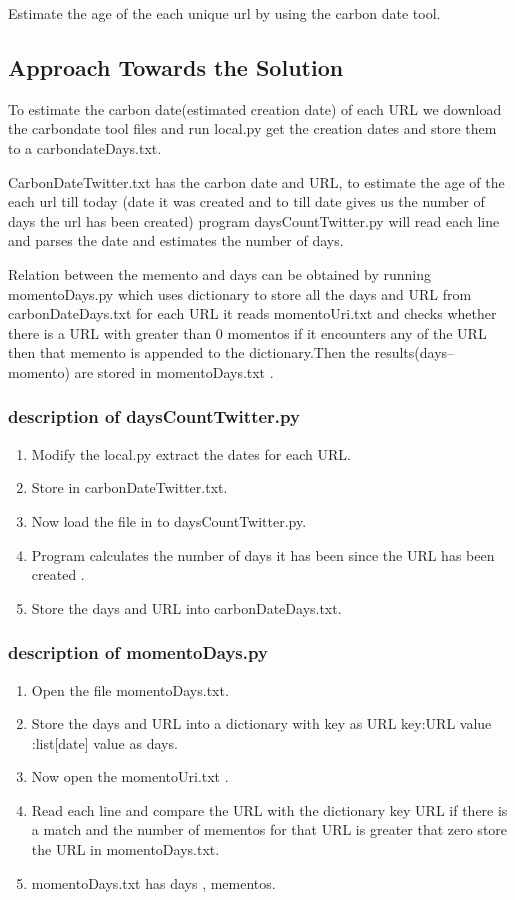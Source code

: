 \documentclass[12pt]{article}
\begin{document}
Estimate the age of the each unique url by using the carbon date tool.
\subsection{Approach Towards the Solution}

To estimate the carbon date(estimated creation date) of each URL we download the carbondate tool files and run local.py get the creation dates and store them to a carbondateDays.txt.

CarbonDateTwitter.txt has the carbon date and URL, to estimate the age of the each url till today (date it was created and to till date gives us the number of days the url has been created) program daysCountTwitter.py will read each line and parses the date and estimates the number of days.

Relation between the memento and days can be obtained by running momentoDays.py which uses dictionary to store all the days and URL from carbonDateDays.txt for each URL it reads momentoUri.txt and checks whether there is a URL with greater than 0 momentos if it encounters any of the URL then that memento is appended to the dictionary.Then the results(days--momento) are stored in momentoDays.txt .
\subsubsection{description of daysCountTwitter.py}
\begin{enumerate}
	\item Modify the local.py extract the dates for each URL.
	\item Store in carbonDateTwitter.txt.
	\item Now load the file in to daysCountTwitter.py.
	\item Program calculates the number of days it has been since the URL has been created .
	\item Store the days and URL into carbonDateDays.txt.	
\end{enumerate}
\subsubsection{description of momentoDays.py}
\begin{enumerate}
	\item Open the file momentoDays.txt.
	\item Store the days and URL into a dictionary with key as URL {key:URL value :list[date]} value as days.	
	\item Now open the momentoUri.txt .
	\item Read each line and compare the URL with the dictionary key URL if there is a match and the number of mementos for that URL is greater that zero store the URL in momentoDays.txt.
	\item momentoDays.txt has days , mementos.
\end{enumerate}
\end{document}
